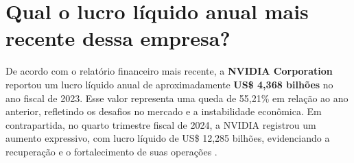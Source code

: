 \section{Qual o lucro líquido anual mais recente dessa empresa?}

De acordo com o relatório financeiro mais recente, a \textbf{NVIDIA Corporation} reportou um lucro líquido anual de aproximadamente \textbf{US\$ 4,368 bilhões} no ano fiscal de 2023. Esse valor representa uma queda de 55,21\% em relação ao ano anterior, refletindo os desafios no mercado e a instabilidade econômica. Em contrapartida, no quarto trimestre fiscal de 2024, a NVIDIA registrou um aumento expressivo, com lucro líquido de US\$ 12,285 bilhões, evidenciando a recuperação e o fortalecimento de suas operações \cite{nvidia_financial_2023_investing}.
